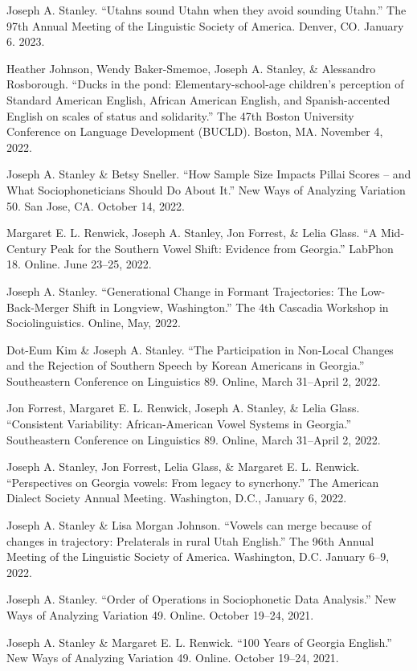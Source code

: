 \documentclass[
]{article}
\begin{document}
{Joseph A. Stanley}. ``Utahns sound Utahn when they avoid sounding
Utahn.'' The 97th Annual Meeting of the Linguistic Society of America.
Denver, CO. January 6. 2023.

{Heather Johnson}, Wendy Baker-Smemoe, {Joseph A. Stanley}, \&
Alessandro Rosborough. ``Ducks in the pond: Elementary-school-age
children's perception of Standard American English, African American
English, and Spanish-accented English on scales of status and
solidarity.'' The 47th Boston University Conference on Language
Development (BUCLD). Boston, MA. November 4, 2022.

{Joseph A. Stanley} \& Betsy Sneller. ``How Sample Size Impacts Pillai
Scores -- and What Sociophoneticians Should Do About It.'' New Ways of
Analyzing Variation 50. San Jose, CA. October 14, 2022.

Margaret E. L. Renwick, {Joseph A. Stanley}, Jon Forrest, \& Lelia
Glass. ``A Mid-Century Peak for the Southern Vowel Shift: Evidence from
Georgia.'' LabPhon 18. Online. June 23--25, 2022.

{Joseph A. Stanley}. ``Generational Change in Formant Trajectories: The
Low-Back-Merger Shift in Longview, Washington.'' The 4th Cascadia
Workshop in Sociolinguistics. Online, May, 2022.

Dot-Eum Kim \& {Joseph A. Stanley}. ``The Participation in Non-Local
Changes and the Rejection of Southern Speech by Korean Americans in
Georgia.'' Southeastern Conference on Linguistics 89. Online, March
31--April 2, 2022.

Jon Forrest, Margaret E. L. Renwick, {Joseph A. Stanley}, \& Lelia
Glass. ``Consistent Variability: African-American Vowel Systems in
Georgia.'' Southeastern Conference on Linguistics 89. Online, March
31--April 2, 2022.

{Joseph A. Stanley}, Jon Forrest, Lelia Glass, \& Margaret E. L.
Renwick. ``Perspectives on Georgia vowels: From legacy to syncrhony.''
The American Dialect Society Annual Meeting. Washington, D.C., January
6, 2022.

{Joseph A. Stanley} \& Lisa Morgan Johnson. ``Vowels can merge because
of changes in trajectory: Prelaterals in rural Utah English.'' The 96th
Annual Meeting of the Linguistic Society of America. Washington, D.C.
January 6--9, 2022.

{Joseph A. Stanley}. ``Order of Operations in Sociophonetic Data
Analysis.'' New Ways of Analyzing Variation 49. Online. October 19--24,
2021.

{Joseph A. Stanley} \& Margaret E. L. Renwick. ``100 Years of Georgia
English.'' New Ways of Analyzing Variation 49. Online. October 19--24,
2021.
\end{document}
